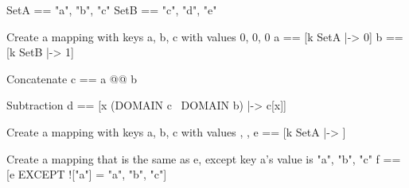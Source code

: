 \begin{tla}
SetA == {"a", "b", "c"}
SetB == {"c", "d", "e"}

\* Create a mapping with keys a, b, c with values 0, 0, 0
a == [k \in SetA |-> 0]
b == [k \in SetB |-> 1]

\* Concatenate 
c == a @@ b

\* Subtraction
d == [x \in (DOMAIN c \ DOMAIN b) |-> c[x]]

\* Create a mapping with keys a, b, c with values {}, {}, {}
e == [k \in SetA |-> {}]

\* Create a mapping that is the same as e, except key a's value is {"a", "b", "c"}
f == [e EXCEPT !["a"] = {"a", "b", "c"}] 

\end{tla}
\begin{tlatex}
%
%
\@pvspace{8.0pt}%
\@x{}%
%
\@xx{}%
%
%
\@pvspace{8.0pt}%
\@x{}%
%
\@xx{}%
%
\@pvspace{8.0pt}%
\@x{}%
%
\@xx{}%
\@pvspace{8.0pt}%
\@x{}%
%
\@xx{}%
%
\@pvspace{8.0pt}%
\@x{}%
%
\@xx{}%
\@pvspace{8.0pt}%
\end{tlatex}
